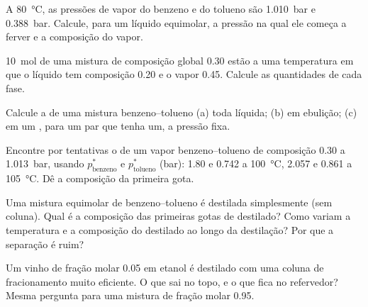 \begin{exercise}[$\star$]\label{exo:b2:liquid-vapour-diagrams:2}
A \qty{80}{\degreeCelsius}, as pressões de vapor do benzeno e do tolueno são
\qty{1.010}{bar} e \qty{0.388}{bar}. Calcule, para um líquido equimolar, a
pressão na qual ele começa a ferver e a composição do vapor.
\end{exercise}

\begin{exercise}[$\star$]\label{exo:b2:liquid-vapour-diagrams:3}
\qty{10}{mol} de uma mistura de composição global 0.30 estão a uma temperatura
em que o líquido tem composição 0.20 e o vapor 0.45. Calcule as quantidades
de cada fase.
\end{exercise}

\begin{exercise}[$\star$]\label{exo:b2:liquid-vapour-diagrams:4}
Calcule a  de uma mistura benzeno--tolueno (a) toda líquida; (b)
em ebulição; (c) em um , para um par que tenha um, a pressão fixa.
\end{exercise}

\begin{exercise}[$\star\star$]\label{exo:b2:liquid-vapour-diagrams:5}
Encontre por tentativas o  de um vapor benzeno--tolueno de
composição 0.30 a \qty{1.013}{bar}, usando $p^*_{\text{benzeno}}$ e $p^*_{\text{tolueno}}$
(\unit{bar}): 1.80 e 0.742 a \qty{100}{\degreeCelsius}, 2.057 e 0.861 a
\qty{105}{\degreeCelsius}. Dê a composição da primeira gota.
\end{exercise}

\begin{exercise}[$\star\star$]\label{exo:b2:liquid-vapour-diagrams:6}
Uma mistura equimolar de benzeno--tolueno é destilada simplesmente (sem
coluna). Qual é a composição das primeiras gotas de destilado? Como variam a
temperatura e a composição do destilado ao longo da destilação? Por que a
separação é ruim?
\end{exercise}

\begin{exercise}[$\star\star$]\label{exo:b2:liquid-vapour-diagrams:7}
Um vinho de fração molar 0.05 em etanol é destilado com uma coluna de
fracionamento muito eficiente. O que sai no topo, e o que fica no refervedor?
Mesma pergunta para uma mistura de fração molar 0.95.
\end{exercise}

